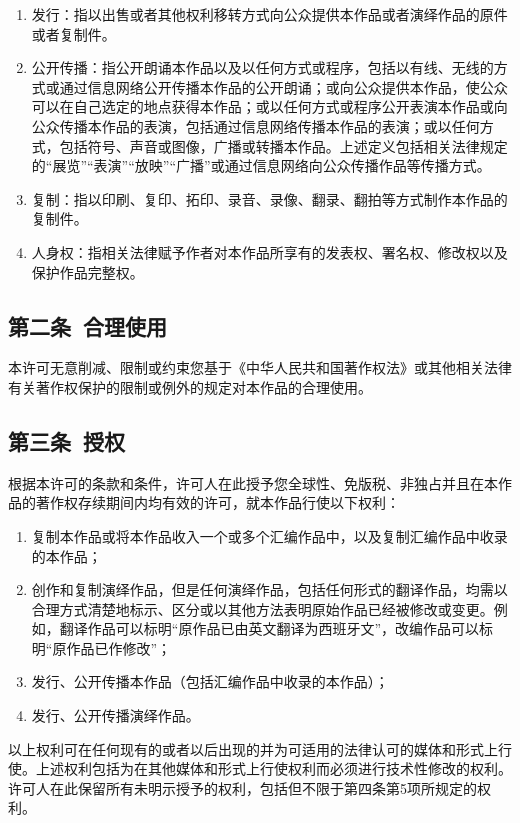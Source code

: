 \begin{enumerate}
	\item 发行：指以出售或者其他权利移转方式向公众提供本作品或者演绎作品的原件或者复制件。
	\item 公开传播：指公开朗诵本作品以及以任何方式或程序，包括以有线、无线的方式或通过信息网络公开传播本作品的公开朗诵；或向公众提供本作品，使公众可以在自己选定的地点获得本作品；或以任何方式或程序公开表演本作品或向公众传播本作品的表演，包括通过信息网络传播本作品的表演；或以任何方式，包括符号、声音或图像，广播或转播本作品。上述定义包括相关法律规定的“展览”“表演”“放映”“广播”或通过信息网络向公众传播作品等传播方式。
	\item 复制：指以印刷、复印、拓印、录音、录像、翻录、翻拍等方式制作本作品的复制件。
	\item 人身权：指相关法律赋予作者对本作品所享有的发表权、署名权、修改权以及保护作品完整权。
\end{enumerate}
\subsection{第二条\ 合理使用}
本许可无意削减、限制或约束您基于《中华人民共和国著作权法》或其他相关法律有关著作权保护的限制或例外的规定对本作品的合理使用。
\subsection{第三条\ 授权}
根据本许可的条款和条件，许可人在此授予您全球性、免版税、非独占并且在本作品的著作权存续期间内均有效的许可，就本作品行使以下权利：
\begin{enumerate}
	\item 复制本作品或将本作品收入一个或多个汇编作品中，以及复制汇编作品中收录的本作品；
	\item 创作和复制演绎作品，但是任何演绎作品，包括任何形式的翻译作品，均需以合理方式清楚地标示、区分或以其他方法表明原始作品已经被修改或变更。例如，翻译作品可以标明“原作品已由英文翻译为西班牙文”，改编作品可以标明“原作品已作修改”；
	\item 发行、公开传播本作品（包括汇编作品中收录的本作品）； 
	\item 发行、公开传播演绎作品。
\end{enumerate}
以上权利可在任何现有的或者以后出现的并为可适用的法律认可的媒体和形式上行使。上述权利包括为在其他媒体和形式上行使权利而必须进行技术性修改的权利。许可人在此保留所有未明示授予的权利，包括但不限于第四条第5项所规定的权利。

